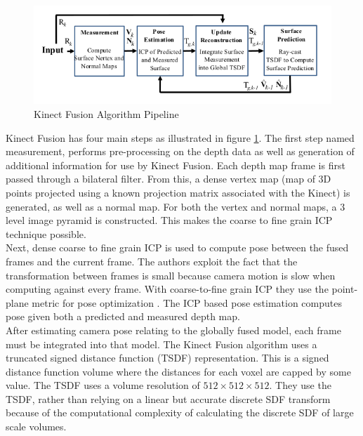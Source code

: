 \begin{figure}[!h]
\centering
\includegraphics[width=12cm]{images/ch1/Newcombe11KinectFusion1}
\caption{Kinect Fusion Algorithm Pipeline \cite{Newcombe11Kinectfusion}}
\label{KFusionPipeline}
\end{figure}

Kinect Fusion has four main steps as illustrated in figure \ref{KFusionPipeline}. The first step named measurement, performs pre-processing on the depth data as well as generation of additional information for use by Kinect Fusion. Each depth map frame is first passed through a bilateral filter. From this, a dense vertex map (map of 3D points projected using a known projection matrix associated with the Kinect) is generated, as well as a normal map. For both the vertex and normal maps, a 3 level image pyramid is constructed. This makes the coarse to fine grain ICP technique possible. \\

Next, dense coarse to fine grain ICP is used to compute pose between the fused frames and the current frame. The authors exploit the fact that the transformation between frames is small because camera motion is slow when computing against every frame. With coarse-to-fine grain ICP they use the point-plane metric for pose optimization \cite{Rusinkiewicz02Real}. The ICP based pose estimation computes pose given both a predicted and measured depth map. \\

After estimating camera pose relating to the globally fused model, each frame must be integrated into that model. The Kinect Fusion algorithm uses a truncated signed distance function (TSDF) representation. This is a signed distance function volume where the distances for each voxel are capped by some value. The TSDF uses a volume resolution of $512\times 512\times 512$. They use the TSDF, rather than relying on a linear but accurate discrete SDF transform \cite{Rasch09Remarks} because of the computational complexity of calculating the discrete SDF of large scale volumes. \\

